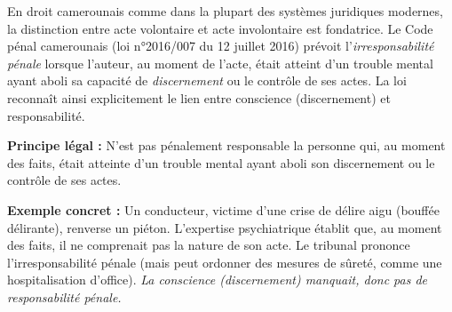 \documentclass[11pt]{article}
\begin{document}
\noindent En droit camerounais comme dans la plupart des systèmes juridiques modernes, la distinction entre acte volontaire et acte involontaire est fondatrice. Le Code pénal camerounais (loi n°2016/007 du 12 juillet 2016) prévoit l'\emph{irresponsabilité pénale} lorsque l'auteur, au moment de l'acte, était atteint d'un trouble mental ayant aboli sa capacité de \emph{discernement} ou le contrôle de ses actes. La loi reconnaît ainsi explicitement le lien entre conscience (discernement) et responsabilité.

\begin{exemplebox}
\textbf{Principe légal :} N'est pas pénalement responsable la personne qui, au moment des faits, était atteinte d'un trouble mental ayant aboli son discernement ou le contrôle de ses actes.

\textbf{Exemple concret :} Un conducteur, victime d'une crise de délire aigu (bouffée délirante), renverse un piéton. L'expertise psychiatrique établit que, au moment des faits, il ne comprenait pas la nature de son acte. Le tribunal prononce l'irresponsabilité pénale (mais peut ordonner des mesures de sûreté, comme une hospitalisation d'office). \emph{La conscience (discernement) manquait, donc pas de responsabilité pénale.}
\end{exemplebox}
\end{document}
